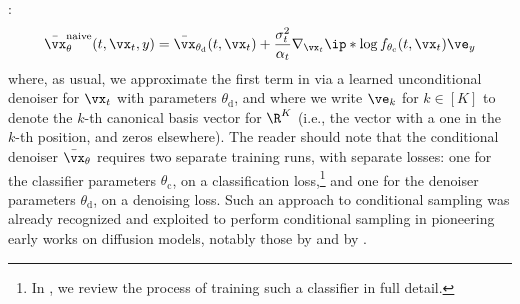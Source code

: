 \documentclass[../../book-main.tex]{subfiles}
\begin{document}
:
\begin{equation}\label{eq:conditional-denoising-mmse-denoiser-paired-data-approx}
  \bar{\vx}_{\theta}^{\mathrm{naive}}(t, \vx_t, y)
  =
  \bar{\vx}_{\theta_{\mathrm{d}}}(t, \vx_t)
  + \frac{\sigma_t^2}{\alpha_t}
  \nabla_{\vx_t}
  \ip*{
    \log f_{\theta_{\mathrm{c}}}(t, \vx_t)
  }{
    \ve_{y}
  }
\end{equation}
where, as usual, we approximate the first term in
 via a learned
unconditional denoiser for $\vx_t$ with parameters $\theta_{\mathrm{d}}$, and
where we write $\ve_k$ for $k \in [K]$ to denote the $k$-th canonical basis
vector for $\R^K$ (i.e., the vector with
a one in the $k$-th position, and zeros elsewhere).
The reader should note that the conditional denoiser $\bar{\vx}_{\theta}$
requires two separate training runs, with separate losses: one for the
classifier parameters $\theta_{\mathrm{c}}$, on a classification
loss,\footnote{In , we review the process of training such
a classifier in full detail.} and one for the denoiser parameters
$\theta_{\mathrm{d}}$, on a denoising loss. Such an approach to conditional
sampling was already recognized and exploited to perform conditional sampling in
pioneering early works on diffusion models, notably those by
\citet{Sohl-Dickstein2015} and by \citet{song2020score}.
\end{document}
